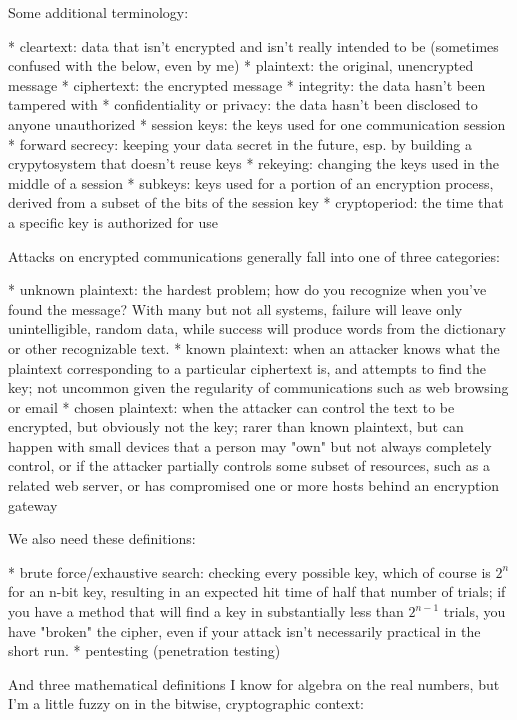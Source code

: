 \documentclass[%
 aip,
 jmp,%
 amsmath,amssymb,
 reprint,%
]{revtex4-1}
\begin{document}
Some additional terminology:

* cleartext: data that isn't encrypted and isn't really intended to be
  (sometimes confused with the below, even by me)
* plaintext: the original, unencrypted message
* ciphertext: the encrypted message
* integrity: the data hasn't been tampered with
* confidentiality or privacy: the data hasn't been disclosed to anyone unauthorized
* session keys: the keys used for one communication session
* forward secrecy: keeping your data secret in the future, esp. by
  building a crypytosystem that doesn't reuse keys
* rekeying: changing the keys used in the middle of a session
* subkeys: keys used for a portion of an encryption process, derived
  from a subset of the bits of the session key
* cryptoperiod: the time that a specific key is authorized for use

Attacks on encrypted communications generally fall into one of three
categories:

* unknown plaintext: the hardest problem; how do you recognize when
  you've found the message?  With many but not all systems, failure
  will leave only unintelligible, random data, while success will
  produce words from the dictionary or other recognizable text.
* known plaintext: when an attacker knows what the plaintext
  corresponding to a particular ciphertext is, and attempts to find
  the key; not uncommon given the regularity of communications such as
  web browsing or email
* chosen plaintext: when the attacker can control the text to be
  encrypted, but obviously not the key; rarer than known plaintext,
  but can happen with small devices that a person may "own" but not
  always completely control, or if the attacker partially controls
  some subset of resources, such as a related web server, or has
  compromised one or more hosts behind an encryption gateway

We also need these definitions:

* brute force/exhaustive search: checking every possible key, which of
  course is $2^n$ for an n-bit key, resulting in an expected hit time of
  half that number of trials; if you have a method that will find a
  key in substantially less than $2^{n-1}$ trials, you have "broken" the
  cipher, even if your attack isn't necessarily practical in the short
  run.
* pentesting (penetration testing)

And three mathematical definitions I know for algebra on the real
numbers, but I'm a little fuzzy on in the bitwise, cryptographic
context:
\end{document}
